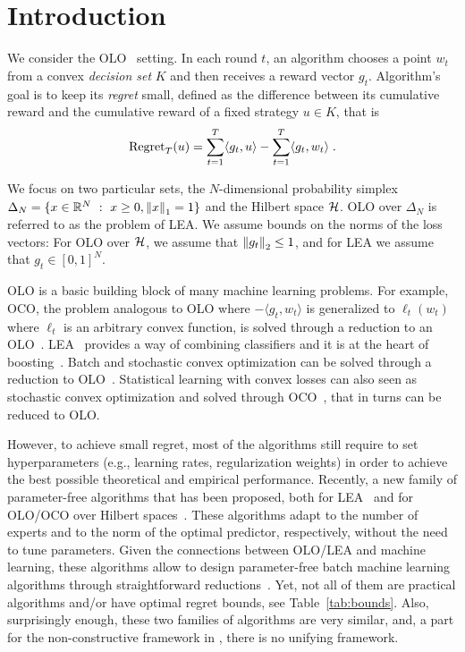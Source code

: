 \section{Introduction}
\label{section:introduction}

We consider the \ac{OLO}~\cite{Cesa-BianchiL06,Shalev-Shwartz12} setting. In each round $t$, an algorithm chooses a point
$w_t$ from a convex \emph{decision set} $K$ and then receives a reward vector
$g_t$. Algorithm's goal is to keep its \emph{regret} small, defined as the
difference between its cumulative reward and the cumulative reward of a fixed
strategy $u \in K$, that is
\[
\operatorname{Regret}_T(u) = \sum_{t=1}^T \langle g_t, u \rangle - \sum_{t=1}^T \langle g_t, w_t \rangle \; .
\]

We focus on two particular sets, the $N$-dimensional probability simplex
$\Delta_N = \{ x \in \mathbb{R}^N ~:~ x \ge 0, \left\|{x}\right\|_1 = 1\}$ and the Hilbert space
$\mathcal{H}$.  \ac{OLO} over $\Delta_N$ is referred to as the problem of \ac{LEA}.  We
assume bounds on the norms of the loss vectors: For \ac{OLO} over $\mathcal{H}$, we
assume that $\left\|{g_t}\right\|_2 \le 1$, and for \ac{LEA} we assume that
$g_t \in [0,1]^N$.

\ac{OLO} is a basic building block of many machine learning problems. For
example, \ac{OCO}, the problem analogous to \ac{OLO} where $-\langle g_t, w_t \rangle$ is
generalized to $\ell_t(w_t)$ where $\ell_t$ is an arbitrary convex function, is
solved through a reduction to an \ac{OLO}~\cite{Shalev-Shwartz12}.
\ac{LEA}~\cite{LittlestoneW94, Vovk98,Cesa-BianchiFHHSW97} provides a way of
combining classifiers and it is at the heart of
boosting~\cite{FreundS97}. Batch and stochastic convex optimization
can be solved through a reduction to \ac{OLO}~\cite{Shalev-Shwartz12}.
Statistical learning with convex losses can also seen as stochastic convex
optimization and solved through \ac{OCO}~\cite{Munro51}, that in turns can be reduced to \ac{OLO}.

However, to achieve small regret, most of the algorithms still require to set
hyperparameters (e.g., learning rates, regularization weights) in
order to achieve the best possible theoretical and empirical performance.
Recently, a new family of parameter-free algorithms that has been proposed, both for \ac{LEA}~\cite{ChaudhuriFH09,ChernovV10,LuoS14,LuoS15,KoolenE15}
and for \ac{OLO}/\ac{OCO} over Hilbert spaces~\cite{StreeterM12,Orabona13, McMahanA13,McMahanO14,Orabona14}.
These algorithms adapt to the number of experts and to the norm of the optimal
predictor, respectively, without the need to tune parameters. 
Given the connections between \ac{OLO}/\ac{LEA} and machine learning, these algorithms
allow to design parameter-free batch machine learning algorithms through
straightforward reductions~\cite{Orabona14,LuoS15}.
Yet, not all of them are practical algorithms and/or have optimal regret bounds, see Table~\ref{tab:bounds}.
Also, surprisingly enough, these two families of algorithms are very similar, and, a part for the non-constructive framework in \cite{FosterRS15}, there is no unifying framework.

